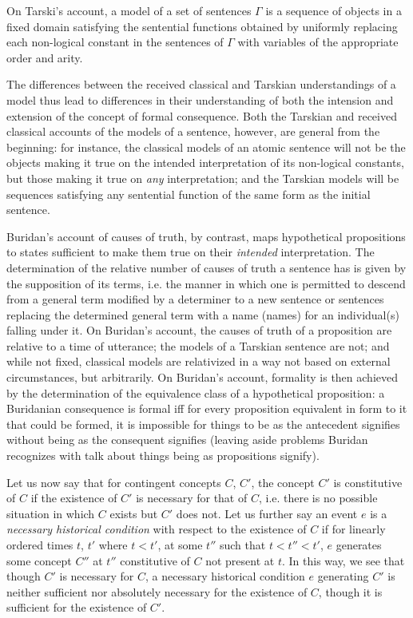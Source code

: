 \documentclass[]{article}
\begin{document}
On Tarski's account, a model of a set of sentences $\Gamma$ is a sequence of objects in a fixed domain satisfying the sentential functions obtained by uniformly replacing each non-logical constant in the sentences of $\Gamma$ with variables of the appropriate order and arity. 

The differences between the received classical and Tarskian understandings of a model thus lead to differences in their understanding of both the intension and extension of the concept of formal consequence. Both the Tarskian and received classical accounts of the models of a sentence, however, are general from the beginning: for instance, the classical models of an atomic sentence will not be the objects making it true on the intended interpretation of its non-logical constants, but those making it true on \textit{any} interpretation; and the Tarskian models will be sequences satisfying any sentential function of the same form as the initial sentence.

Buridan's account of causes of truth, by contrast, maps hypothetical propositions to states sufficient to make them true on their \textit{intended} interpretation. The determination of the relative number of causes of truth a sentence has is given by the supposition of its terms, i.e. the manner in which one is permitted to descend from a general term modified by a determiner to a new sentence or sentences replacing the determined general term with a name (names) for an individual(s) falling under it. On Buridan's account, the causes of truth of a proposition are relative to a time of utterance; the models of a Tarskian sentence are not; and while not fixed, classical models are relativized in a way not based on external circumstances, but arbitrarily. On Buridan's account, formality is then achieved by the determination of the equivalence class of a hypothetical proposition: a Buridanian consequence is formal iff for every proposition equivalent in form to it that could be formed, it is impossible for things to be as the antecedent signifies without being as the consequent signifies (leaving aside problems Buridan recognizes with talk about things being as propositions signify).

Let us now say that for contingent concepts $C$, $C'$, the concept $C'$ is constitutive of $C$ if the existence of $C'$ is necessary for that of $C$, i.e. there is no possible situation in which $C$ exists but $C'$ does not. Let us further say an event $e$ is a \textit{necessary historical condition} with respect to the existence of $C$ if for linearly ordered times $t$, $t'$ where $t<t'$, at some $t''$ such that $t<t''<t'$, $e$ generates some concept $C''$ at $t''$ constitutive of $C$ not present at $t$. In this way, we see that though $C'$ is necessary for $C$, a necessary historical condition $e$ generating $C'$ is neither sufficient nor absolutely necessary for the existence of $C$, though it is sufficient for the existence of $C'$.
\end{document}
